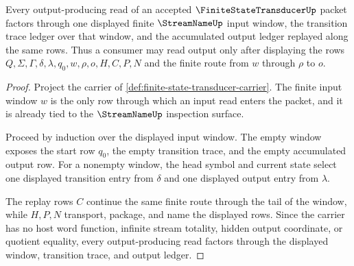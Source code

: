 \begin{theorem}
\label{thm:finite-state-transducer-stream-output-trace-obligation}
Every output-producing read of an accepted $\FiniteStateTransducerUp$ packet factors through one displayed finite $\StreamNameUp$ input window, the transition trace ledger over that window, and the accumulated output ledger replayed along the same rows. Thus a consumer may read output only after displaying the rows $Q,\Sigma,\Gamma,\delta,\lambda,q_0,w,\rho,o,H,C,P,N$ and the finite route from $w$ through $\rho$ to $o$.
\end{theorem}
\begin{proof}
Project the carrier of \autoref{def:finite-state-transducer-carrier}. The finite input window $w$ is the only row through which an input read enters the packet, and it is already tied to the $\StreamNameUp$ inspection surface.

Proceed by induction over the displayed input window. The empty window exposes the start row $q_0$, the empty transition trace, and the empty accumulated output row. For a nonempty window, the head symbol and current state select one displayed transition entry from $\delta$ and one displayed output entry from $\lambda$.

The replay rows $C$ continue the same finite route through the tail of the window, while $H,P,N$ transport, package, and name the displayed rows. Since the carrier has no host word function, infinite stream totality, hidden output coordinate, or quotient equality, every output-producing read factors through the displayed window, transition trace, and output ledger.
\end{proof}

